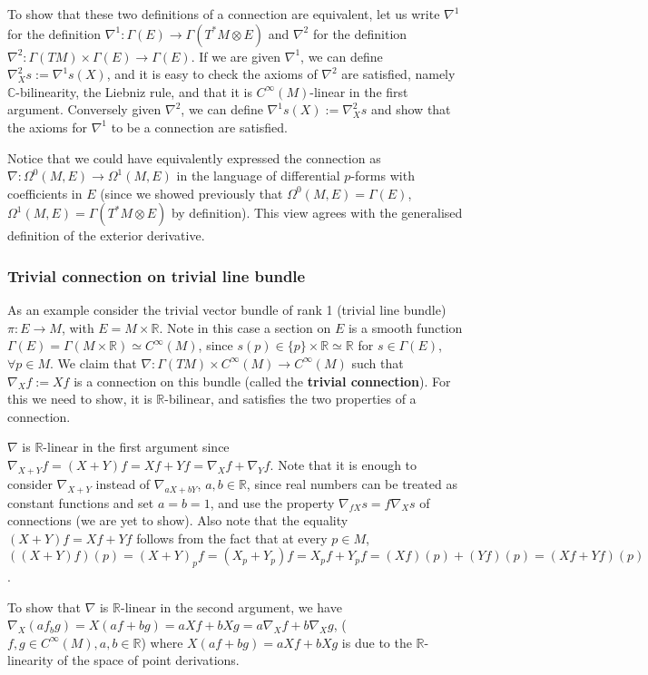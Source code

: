 \documentclass[a4paper]{article}
\theoremstyle{definition} \newtheorem*{definition}{Definition}
\theoremstyle{definition} \newtheorem*{definitions}{Definitions}
\theoremstyle{plain} \newtheorem{theorem}{Theorem}[section]
\theoremstyle{plain} \newtheorem{proposition}[theorem]{Proposition}
\theoremstyle{plain} \newtheorem{corollary}[theorem]{Corollary}
\theoremstyle{plain} \newtheorem{lemma}[theorem]{Lemma}
\theoremstyle{plain} \newtheorem{example}[theorem]{Example}
\newcommand{\defn}[1]{\textbf{#1}}
\newcommand{\realnos}{\mathbb{R}}
\newcommand{\complexnos}{\mathbb{C}}
\newcommand{\smooth}{C^\infty}
\begin{document}
To show that these two definitions of a connection are equivalent, let us write $\nabla^1$ for the definition $\nabla^1:\Gamma(E)\to \Gamma(T^*M\otimes E)$ and $\nabla^2$ for the definition $\nabla^2:\Gamma(TM)\times \Gamma(E)\to \Gamma(E)$. If we are given $\nabla^1$, we can define $\nabla^2_X s:=\nabla^1 s(X)$, and it is easy to check the axioms of $\nabla^2$ are satisfied, namely $\complexnos$-bilinearity, the Liebniz rule, and that it is $\smooth(M)$-linear in the first argument. Conversely given $\nabla^2$, we can define $\nabla^1 s(X):=\nabla^2_X s$ and show that the axioms for $\nabla^1$ to be a connection are satisfied. 

Notice that we could have equivalently expressed the connection as $\nabla:\Omega^0(M, E)\to \Omega^1(M, E)$ in the language of differential $p$-forms with coefficients in $E$ (since we showed previously that $\Omega^0(M, E)=\Gamma(E)$, $\Omega^1(M, E)=\Gamma(T^*M\otimes E)$ by definition). This view agrees with the generalised definition of the exterior derivative.

\subsubsection{Trivial connection on trivial line bundle}
As an example consider the trivial vector bundle of rank 1 (trivial line bundle)
$\pi:E\to M$, with $E=M\times \realnos$.
Note in this case a section on $E$ is a smooth function $\Gamma(E)=\Gamma(M\times \realnos)\simeq \smooth(M)$, since $s(p)\in \{p\}\times \realnos \simeq \realnos$ for $s\in \Gamma(E)$, $\forall p\in M$.
We claim that $\nabla: \Gamma(TM)\times \smooth(M)\to \smooth(M)$ such that $\nabla_X f := Xf$ is a connection on this bundle (called the \defn{trivial connection}). For this we need to show, it is $\realnos$-bilinear, and satisfies the two properties of a connection. 

$\nabla$ is $\realnos$-linear in the first argument since $\nabla_{X+Y}f=(X+Y)f=Xf+Yf=\nabla_Xf + \nabla_Yf$. Note that it is enough to consider $\nabla_{X+Y}$ instead of $\nabla_{aX+bY}$, $a,b\in \realnos$, since real numbers can be treated as constant functions and set $a=b=1$, and use the property $\nabla_{fX}s=f\nabla_X s$ of connections (we are yet to show). Also note that the equality $(X+Y)f=Xf+Yf$ follows from the fact that at every $p\in M$,
$((X+Y)f)(p)=(X+Y)_pf=(X_p+Y_p)f=X_pf+Y_pf=(Xf)(p)+(Yf)(p)=(Xf+Yf)(p)$.

To show that $\nabla$ is $\realnos$-linear in the second argument, we have $\nabla_X(af_bg)=X(af+bg)=aXf+bXg=a\nabla_Xf + b\nabla_X g$, ($f, g \in \smooth (M), a,b\in \realnos$) where $X(af+bg)=aXf+bXg$ is due to the $\realnos$-linearity of the space of point derivations. 
\end{document}
